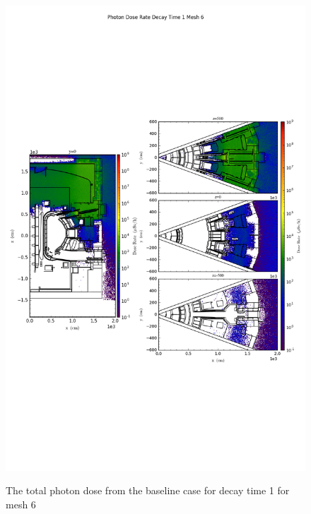 \begin{figure}[ht!]
\centering
\includegraphics[trim={0cm 9cm 0cm 10cm},clip,scale=0.75]{../plots/final_model_nob4c/Photon_Dose_Rate_Decay_Time_1_Mesh_6.png}
\label{fig:photons_dc1_no4bc_m6_flux}
\caption{The total photon dose from the baseline case for decay time 1 for mesh 6}
\end{figure}
